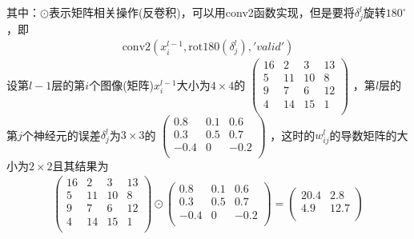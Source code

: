             其中：$\odot$表示矩阵相关操作(反卷积)，可以用conv2函数实现，但是要将$\delta_j^l$旋转$180^\circ$，即
            \begin{align*}
            \mathrm{conv2}(x_i^{l-1},\mathrm{rot180}(\delta_j^l),'valid')
            \end{align*}
            设第$l-1$层的第$i$个图像(矩阵)$x_i^{l-1}$大小为$4\times 4$的
            \begin{math}
            \left(
            \begin{smallmatrix}
            16 & 2  & 3  & 13\\
            5  & 11 & 10 & 8 \\
            9  & 7  & 6  & 12\\
            4  & 14 & 15 & 1 \\
            \end{smallmatrix}
            \right)
            \end{math}
            ，第$l$层的第$j$个神经元的误差$\delta_j^l$为$3\times 3$的
            \begin{math}
            \left(
            \begin{smallmatrix}
            0.8  & 0.1 &  0.6\\
            0.3  & 0.5 &  0.7\\
            -0.4 & 0   & -0.2\\
            \end{smallmatrix}
            \right)
            \end{math}
            ，这时的$w_{ij}^l$的导数矩阵的大小为$2\times 2$且其结果为
            \begin{align*}
            \begin{pmatrix}
            16 & 2  & 3  & 13\\
            5  & 11 & 10 & 8 \\
            9  & 7  & 6  & 12\\
            4  & 14 & 15 & 1 \\
            \end{pmatrix}
            \odot
            \begin{pmatrix}
            0.8  & 0.1 &  0.6\\
            0.3  & 0.5 &  0.7\\
            -0.4 & 0   & -0.2\\
            \end{pmatrix}
            =
            \begin{pmatrix}
            20.4 & 2.8\\
            4.9 & 12.7\\
            \end{pmatrix}
            \end{align*}
